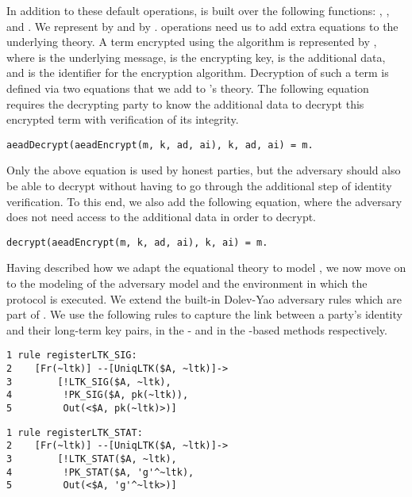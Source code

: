 \documentclass[runningheads]{llncs}
\begin{document}
In addition to these default operations, \mEdhoc{} is built over the following functions: \mHkdfExpand, \mHkdfExtract, and \mAead{}.
%
We represent \mHkdfExpand{} by  and \mHkdfExtract{} by 
.
%
\mAead{} operations need us to add extra equations to the underlying theory.
%
A term encrypted using the \mAead{} algorithm is represented by ,
where  is the underlying message,  is the encrypting key,
 is the additional data, and  is the identifier for the
encryption algorithm.
%
Decryption of such a term is defined via two equations that we add to
\mTamarin's theory.
%
The following equation requires the decrypting party to know the additional
data  to decrypt this encrypted term with verification of its integrity.
\begin{small}
\begin{verbatim}
aeadDecrypt(aeadEncrypt(m, k, ad, ai), k, ad, ai) = m.
\end{verbatim}
\end{small}
%
Only the above equation is used by honest parties, but the adversary should
also be able to decrypt without having to go through the additional step of
identity verification.
%
To this end, we also add the following equation, where the adversary does not
need access to the additional data  in order to decrypt.
%
\begin{small}\begin{verbatim}
decrypt(aeadEncrypt(m, k, ad, ai), k, ai) = m.
\end{verbatim}\end{small}
%

Having described how we adapt the equational theory to model \mEdhoc,
we now move on to the modeling of the adversary model and the 
environment in
which the protocol is executed.
%
We extend the built-in Dolev-Yao adversary rules which are part of 
\mTamarin.
%
We use the following rules to capture the link between a party's identity and
their long-term key pairs, in the \mSig{}- and in the \mStat{}-based methods
respectively.
\begin{center}
\begin{minipage}{0.48\textwidth}
\begin{scriptsize}
\begin{verbatim}
1 rule registerLTK_SIG:
2    [Fr(~ltk)] --[UniqLTK($A, ~ltk)]->
3        [!LTK_SIG($A, ~ltk),
4         !PK_SIG($A, pk(~ltk)),
5         Out(<$A, pk(~ltk)>)]
\end{verbatim}
\end{scriptsize}
\end{minipage}
\hfill\vline\hfill
\begin{minipage}{0.48\textwidth}
\begin{scriptsize}
\begin{verbatim}
1 rule registerLTK_STAT:
2    [Fr(~ltk)] --[UniqLTK($A, ~ltk)]->
3        [!LTK_STAT($A, ~ltk),
4         !PK_STAT($A, 'g'^~ltk),
5         Out(<$A, 'g'^~ltk>)]
\end{verbatim}
\end{scriptsize}
\end{minipage}
\end{center}
\end{document}
